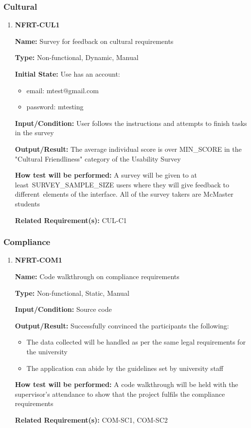 \documentclass[12pt, titlepage]{article}
\begin{document}
\subsubsection{Cultural}
\begin{enumerate}
\item{\textbf{NFRT-CUL1}}

\textbf{Name:} Survey for feedback on cultural requirements

\textbf{Type:} Non-functional, Dynamic, Manual

\textbf{Initial State:} Use has an account:
\begin{itemize}
\item email: mtest@gmail.com
\item password: mtesting
\end{itemize}

\textbf{Input/Condition:} User follows the instructions and attempts to finish tasks in the survey

\textbf{Output/Result:} The average individual score is over MIN\_SCORE in the "Cultural Friendliness" category of the Usability Survey

\textbf{How test will be performed:} A survey will be given to at least\
SURVEY\_SAMPLE\_SIZE users where they will give feedback to different\
elements of the interface. All of the survey takers are McMaster students

\textbf{Related Requirement(s):} CUL-C1
\end{enumerate}

\subsubsection{Compliance}
\begin{enumerate}
\item{\textbf{NFRT-COM1}}

\textbf{Name:} Code walkthrough on compliance requirements

\textbf{Type:} Non-functional, Static, Manual

\textbf{Input/Condition:} Source code

\textbf{Output/Result:} Successfully convinced the participants the following:
\begin{itemize}
\item The data collected will be handled as per the same legal requirements for the university
\item The application can abide by the guidelines set by university staff
\end{itemize}

\textbf{How test will be performed:} A code walkthrough will be held with the supervisor's attendance to show that the project fulfils the compliance requirements

\textbf{Related Requirement(s):} COM-SC1, COM-SC2
\end{enumerate}
\end{document}

